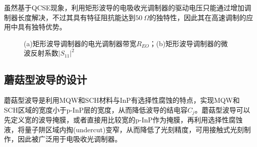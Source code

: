 虽然基于QCSE现象，利用矩形波导的电吸收光调制器的驱动电压只能通过增加调制器长度解决，不过其具有特征阻抗能达到$50~\Omega$的独特性，因此其在高速调制的应用中具有独特优势。
\begin{figure}[htb]
	\small
\caption{(a)矩形波导调制器的电光调制器带宽$R_{EO}$；(b)矩形波导调制器的微波反射系数$|S_{11}|^2$}
\label{fig_ch2_rect_3dB_S11}	
\end{figure}
		
\subsection{蘑菇型波导的设计}
蘑菇型波导是利用MQW和SCH材料与InP有选择性腐蚀的特点，实现MQW和SCH区域的宽度小于p-InP层的宽度，从而降低波导的结电容$C_j$。蘑菇型波导可以先定义宽的波导掩膜，或者直接用比较宽的p-InP作为掩膜，再利用选择性腐蚀液，将量子阱区域内掏(undercut)变窄，从而降低了光刻精度，可用接触式光刻制作，因此被广泛用于电吸收光调制器\cite{chiu2005enhanced, kuo2008high, tang201150, tang2012over, tang2012energy, chen2011forty}。

